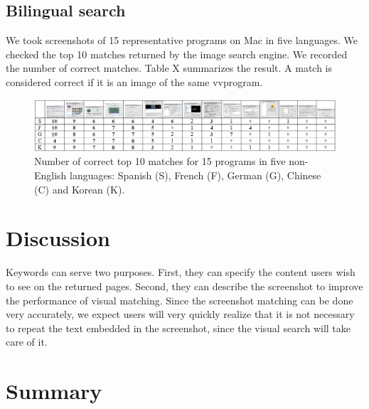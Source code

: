 \documentclass{www2010-submission}
\begin{document}
\subsection{Bilingual search}

We took screenshots of 15 representative programs on Mac in five
languages. We checked the top 10 matches returned by the image search
engine. We recorded the number of correct matches. Table X summarizes
the result. A match is considered correct if it is an image of the same
vvprogram. 

\begin{figure}
\includegraphics[width=2\columnwidth]{figure/bilingual_search.png}
\caption{Number of correct top 10 matches for 15 programs in five non-English
languages: Spanish (S), French (F), German (G), Chinese (C) and Korean (K).}
\end{figure}


\section{Discussion}

Keywords can serve two purposes. First, they can specify the
content users wish to see on the returned pages. Second, they can
describe the screenshot to improve the performance of visual
matching. Since the screenshot matching can be done very
accurately, we expect users will very quickly realize that it is
not necessary to repeat the text embedded in the screenshot, since
the visual search will take care of it.


\section{Summary}


\balancecolumns %
\end{document}
